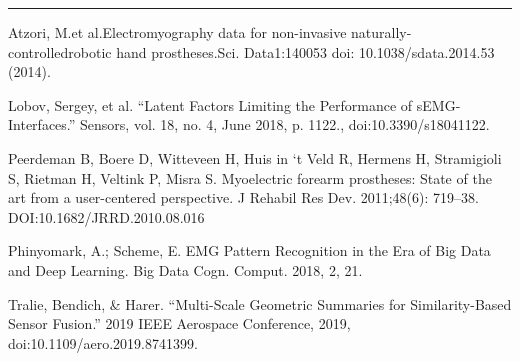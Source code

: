 \documentclass[11pt]{article}
\begin{document}
\begin{center}
\noindent\rule{16cm}{0.4pt}
\end{center}


\begin{thebibliography}{5}

 Atzori, M.et al.Electromyography data for non-invasive naturally-controlledrobotic hand prostheses.Sci. Data1:140053 doi: 10.1038/sdata.2014.53 (2014).

 Lobov, Sergey, et al. “Latent Factors Limiting the Performance of sEMG-Interfaces.” Sensors, vol. 18, no. 4, June 2018, p. 1122., doi:10.3390/s18041122.

 Peerdeman  B,  Boere  D,  Witteveen  H,  Huis  in  ‘t  Veld  R,  Hermens H, Stramigioli S, Rietman H, Veltink P, Misra S. Myoelectric  forearm  prostheses:  State  of  the  art  from  a  user-centered perspective. J Rehabil Res Dev. 2011;48(6): 719–38. DOI:10.1682/JRRD.2010.08.016

 Phinyomark, A.; Scheme, E. EMG Pattern Recognition in the Era of Big Data and Deep Learning. Big Data Cogn. Comput. 2018, 2, 21. 

 Tralie, Bendich, \& Harer. “Multi-Scale Geometric Summaries for Similarity-Based Sensor Fusion.” 2019 IEEE Aerospace Conference, 2019, doi:10.1109/aero.2019.8741399.

\end{thebibliography}
  
\end{document}
